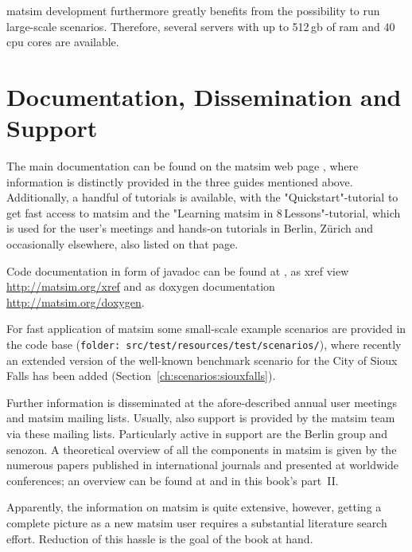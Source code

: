 \gls{matsim} development furthermore greatly benefits from the possibility to run large-scale scenarios. Therefore, several servers with up to 512\,\gls{gb} of \gls{ram} and 40\,\gls{cpu} cores are available.  

\section{Documentation, Dissemination and Support}
The main documentation can be found on the \gls{matsim} web page \citep[][]{MATSIM-Docu_Webpage_2015}, where information is distinctly provided in the three guides mentioned above. Additionally, a handful of tutorials is available, with the "Quickstart"-tutorial to get fast access to \gls{matsim} and the "Learning \gls{matsim} in 8\,Lessons"-tutorial, which is used for the user's meetings and hands-on tutorials in Berlin, Zürich and occasionally elsewhere, also listed on that page. 

Code documentation in form of \gls{javadoc} can be found at \citet[][]{MATSIM-Javadoc_Webpage_2015}, as \gls{xref} view \url{http://matsim.org/xref} and as doxygen documentation \url{http://matsim.org/doxygen}. %

For fast application of \gls{matsim} some small-scale example scenarios are provided in the code base (\lstinline|folder: src/test/resources/test/scenarios/|), where recently an extended version of the well-known benchmark scenario for the City of Sioux Falls has been added \citep[][]{ChakirovFourie_TechRep_FCL_2014} (Section~\ref{ch:scenarios:siouxfalls}).

Further information is disseminated at the afore-described annual user meetings and \gls{matsim} mailing lists. Usually, also support is provided by the \gls{matsim} team via these mailing lists. Particularly active in support are the Berlin group and \gls{senozon}. A theoretical overview of all the components in \gls{matsim} is given by the numerous papers published in international journals and presented at worldwide conferences; an overview can be found at \citep[][]{MATSIM-Publications_Webpage_2015} and in this book's part~II.

Apparently, the information on \gls{matsim} is quite extensive, however, getting a complete picture as a new \gls{matsim} user requires a substantial literature search effort. Reduction of this hassle is the goal of the book at hand.

